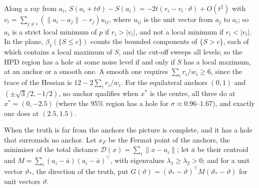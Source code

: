 \begin{remark}\label{rem:three}
Along a ray from $a_i$, $S(a_i + t\vartheta) - S(a_i) = -2t(r_i - v_i\cdot\vartheta) + O(t^2)$ with
$v_i = \sum_{j \ne i}(\|a_i - a_j\| - r_j)u_{ij}$, where $u_{ij}$ is the unit vector from $a_j$ to $a_i$; so $a_i$ is a
strict local minimum of $p$ if $r_i > |v_i|$, and not a local minimum if $r_i < |v_i|$. In the plane,
$\beta_1(\{S \le c\})$ counts the bounded components of $\{S > c\}$, each of which contains a local maximum of $S$, and
the cut-off sweeps all levels; so the HPD region has a hole at some noise level if and only if $S$ has a local maximum,
at an anchor or a smooth one. A smooth one requires $\sum_i r_i/w_i \ge 6$, since the trace of the Hessian is
$12 - 2\sum_i r_i/w_i$. For the equilateral anchors $(0, 1)$ and $(\pm\sqrt3/2, -1/2)$, no anchor qualifies when $x^*$
is the centre, all three do at $x^* = (0, -2.5)$ (where the 95\% region has a hole for $\sigma \approx 0.96$--$1.67$),
and exactly one does at $(2.5, 1.5)$.
\end{remark}

When the truth is far from the anchors the picture is complete, and it has a hole that surrounds no anchor. Let $x_F$
be the Fermat point of the anchors, the minimiser of the total distance $\mathcal D(x) = \sum_i\|x - a_i\|$; let $\bar a$ be
their centroid and $M = \sum_i(a_i - \bar a)(a_i - \bar a)^\top$, with eigenvalues $\lambda_1 \ge \lambda_2 > 0$; and for a
unit vector $\vartheta_*$, the direction of the truth, put $G(\vartheta) = (\vartheta_* - \vartheta)^\top M(\vartheta_* - \vartheta)$ for
unit vectors $\vartheta$.

